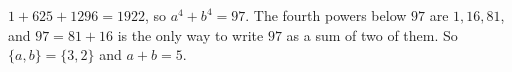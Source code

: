 $1+625+1296=1922$, so $a^4+b^4=97$. The fourth powers below $97$ are $1,16,81$, and $97=81+16$ is the only way to write $97$ as a sum of two of them. So $\{a,b\}=\{3,2\}$ and $a+b=\boxed{5}$.
